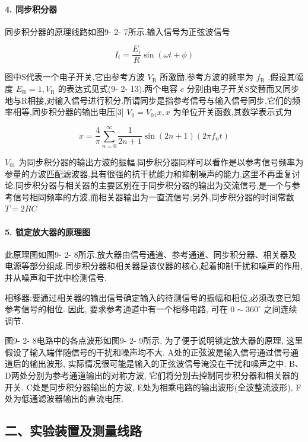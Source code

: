 \documentclass[12pt,a4paper]{article}
\begin{document}
\paragraph{4. 同步积分器}

同步积分器的原理线路如图9- 2- 7所示.输入信号为正弦波信号

\[
I_{i} = \frac{E_{i}}{R}\sin (\omega t + \phi)
\]

图中S代表一个电子开关,它由参考方波 \(V_{\mathrm{R}}\) 所激励,参考方波的频率为 \(f_{\mathrm{R}}\) ,假设其幅度 \(E_{\mathrm{R}} = 1,V_{\mathrm{R}}\) 的表达式见式(9- 2- 13).两个电容 \(c\) 分别由电子开关S交替而又同步地与R相接,对输入信号进行积分.所谓同步是指参考信号与输入信号同步,它们的频率相等,同步积分器的输出电压[3] \(V_{0} = V_{01}x,x\) 为单位开关函数,其数学表示式为

\[
x = \frac{4}{\pi}\sum_{n = 0}^{\infty}\frac{1}{2n + 1}\sin (2n + 1)(2\pi f_{n}t)
\]

\(V_{01}\) 为同步积分器的输出方波的振幅.同步积分器同样可以看作是以参考信号频率为参量的方波匹配滤波器,具有很强的抗干扰能力和抑制噪声的能力,这里不再重复讨论.同步积分器与相关器的主要区别在于同步积分器的输出为交流信号,是一个与参考信号相同频率的方波,而相关器输出为一直流信号;另外,同步积分器的时间常数 \(T = 2R C\)

\paragraph{5. 锁定放大器的原理图}

此原理图如图9- 2- 8所示.放大器由信号通道、参考通道、同步积分器、相关器及电源等部分组成.同步积分器和相关器是该仪器的核心,起着抑制干扰和噪声的作用,并从噪声和干扰中检测信号.

相移器:要通过相关器的输出信号确定输入的待测信号的振幅和相位,必须改变已知参考信号的相位. 因此, 要求参考通道中有一个相移电路, 可在 \(0 \sim 360^{\circ}\) 之间连续调节.

图9- 2- 8电路中的各点波形如图9- 2- 9所示, 为了便于说明锁定放大器的原理, 这里假设了输入端伴随信号的干扰和噪声均不大. A处的正弦波是输入信号通过信号通道后的输出波形, 实际情况很可能是输入的正弦波信号淹没在干扰和噪声之中. B、D两处分别为参考通道输出的对称方波, 它们将分别去控制同步积分器和相关器的开关. C处是同步积分器输出的方波, E处为相乘电路的输出波形(全波整流波形), F处为低通滤波器输出的直流电压.

\subsection*{二、实验装置及测量线路}
\end{document}
